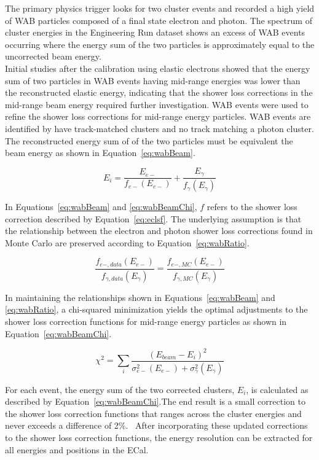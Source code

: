 The primary physics trigger looks for two cluster events and recorded a high yield of WAB particles composed of a final state electron and photon. The spectrum of cluster energies in the Engineering Run dataset shows an excess of WAB events occurring where the energy sum of the two particles is approximately equal to the uncorrected beam energy.  \\
\indent Initial studies after the calibration using elastic electrons showed that the energy sum of two particles in WAB events having mid-range energies was lower than the reconstructed elastic energy, indicating that the shower loss corrections in the mid-range beam energy required further investigation. WAB events were used to refine the shower loss corrections for mid-range energy particles. WAB events are identified by have track-matched clusters and no track matching a photon cluster. The reconstructed energy sum of of the two particles must be equivalent the beam energy as shown in Equation~\eqref{eq:wabBeam}.~\cite{CalibNote}

\begin{equation}
	\label{eq:wabBeam}
	E_i = \dfrac{E_{e-}}{f_{e-}(E_{e-})}+\dfrac{E_{\gamma}}{f_{\gamma}(E_{\gamma})}
\end{equation}

In Equations~\eqref{eq:wabBeam} and \eqref{eq:wabBeamChi}, $f$ refers to the shower loss correction described by Equation~\eqref{eq:eclsf}. The underlying assumption is that the relationship between the electron and photon shower loss corrections found in Monte Carlo are preserved according to Equation~\eqref{eq:wabRatio}.

\begin{equation}
	\label{eq:wabRatio}
	 \dfrac{f_{e-, data}(E_{e-})}{f_{\gamma, data}(E_{\gamma})}= \dfrac{f_{e-, MC}(E_{e-})}{f_{\gamma, MC}(E_{\gamma})}
\end{equation}

In maintaining the relationships shown in Equations~\eqref{eq:wabBeam} and \eqref{eq:wabRatio}, a chi-squared minimization yields the optimal adjustments to the shower loss correction functions for mid-range energy particles as shown in Equation~\eqref{eq:wabBeamChi}.

\begin{equation}
	\label{eq:wabBeamChi}
	\chi^2 =\sum_{i} \dfrac{(E_{beam}-E_i)^2}{\sigma_{e-}^2(E_{e-})+\sigma_{\gamma}^2(E_{\gamma})}	
\end{equation}

For each event, the energy sum of the two corrected clusters, $E_i$, is calculated as described by Equation~\eqref{eq:wabBeamChi}.The end result is a small correction to the shower loss correction functions that ranges across the cluster energies and never exceeds a difference of 2$\%$.~\cite{CalibNote} After incorporating these updated corrections to the shower loss correction functions, the energy resolution can be extracted for all energies and positions in the ECal.  
